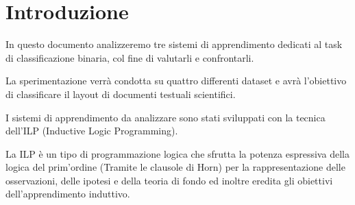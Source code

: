 \section{Introduzione}

In questo documento analizzeremo tre sistemi di apprendimento dedicati al task di classificazione binaria, col fine di valutarli e confrontarli.

La sperimentazione verrà condotta su quattro differenti dataset e avrà l'obiettivo di classificare il layout di documenti testuali scientifici.

I sistemi di apprendimento da analizzare sono stati sviluppati con la tecnica dell’ILP (Inductive Logic Programming).

La ILP è un tipo di programmazione logica che sfrutta la potenza espressiva della logica del prim'ordine (Tramite le clausole di Horn) per la rappresentazione delle osservazioni, delle ipotesi e della teoria di fondo ed inoltre eredita gli obiettivi dell’apprendimento induttivo.